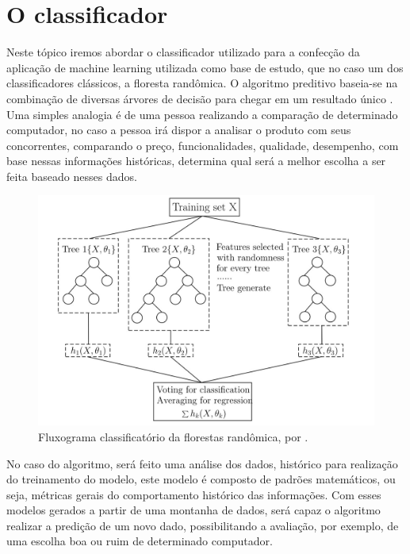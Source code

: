 \section{O classificador} %
Neste tópico iremos abordar o classificador utilizado para a confecção da aplicação de machine learning utilizada como base de estudo, que no caso um dos classificadores clássicos, a floresta randômica. O algoritmo preditivo baseia-se na combinação de diversas árvores de decisão para chegar em um resultado único \cite{Breiman2001}. 
Uma simples analogia é de uma pessoa realizando a comparação de determinado computador, no caso a pessoa irá dispor a analisar o produto com seus concorrentes, comparando o preço,  funcionalidades, qualidade, desempenho, com base nessas informações históricas, determina qual será a melhor escolha a ser feita baseado nesses dados.




\begin{figure}[h!]
	\includegraphics[width=\linewidth]{topics/chart.jpg}
	\caption{Fluxograma classificatório da florestas randômica, por \cite{Zhang2018}.}
	\label{fig:chartrandomforest}
\end{figure}



No caso do algoritmo, será feito uma análise dos dados, histórico para realização do treinamento do modelo, este modelo é composto de padrões matemáticos, ou seja, métricas gerais do comportamento histórico das informações. Com esses modelos gerados a partir de uma montanha de dados, será capaz o algoritmo realizar a predição de um novo dado, possibilitando a avaliação, por exemplo, de uma escolha boa ou ruim de determinado computador.